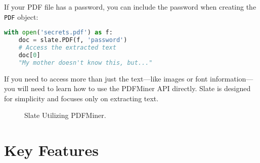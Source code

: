 If your PDF file has a password, you can include the password when creating the \texttt{PDF} object:
\begin{lstlisting}[language=Python, caption=Text Extraction from Password-Protected PDFs]
	with open('secrets.pdf') as f:
	doc = slate.PDF(f, 'password')
	# Access the extracted text
	doc[0]
	"My mother doesn't know this, but..."
\end{lstlisting}
If you need to access more than just the text—like images or font information—you will need to learn how to use the PDFMiner API directly. Slate is designed for simplicity and focuses only on extracting text.
\begin{figure}[h!]
	\centering
	\caption{Slate Utilizing PDFMiner.}
	\label{fig:pdf_slate_pdfminer}
\end{figure}

\section{Key Features}

